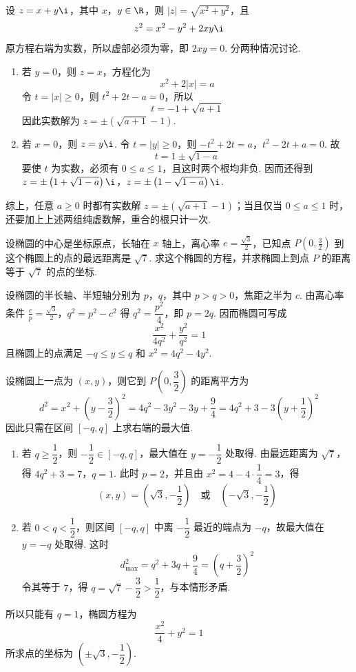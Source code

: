 \begin{solution}
设 \(z=x+y\i\)，其中 \(x\)，\(y\in\R\)，则 \(|z|=\sqrt{x^2+y^2}\)，且
\[
z^2=x^2-y^2+2xy\i
\]
原方程右端为实数，所以虚部必须为零，即 \(2xy=0\). 分两种情况讨论.
\begin{enumerate}
\item 若 \(y=0\)，则 \(z=x\)，方程化为
\[
x^2+2|x|=a
\]
令 \(t=|x|\geqslant0\)，则 \(t^2+2t-a=0\)，所以
\[
t=-1+\sqrt{a+1}
\]
因此实数解为 \(z=\pm\left(\sqrt{a+1}-1\right)\).

\item 若 \(x=0\)，则 \(z=y\i\). 令 \(t=|y|\geqslant0\)，则
\(-t^2+2t=a\)，\(t^2-2t+a=0\).
故
\[
t=1\pm\sqrt{1-a}
\]
要使 \(t\) 为实数，必须有 \(0\leqslant a\leqslant1\)，且这时两个根均非负. 因而还得到
\(z=\pm\left(1+\sqrt{1-a}\right)\i\)，\(z=\pm\left(1-\sqrt{1-a}\right)\i\).
\end{enumerate}
综上，任意 \(a\geqslant0\) 时都有实数解 \(z=\pm\left(\sqrt{a+1}-1\right)\)；当且仅当 \(0\leqslant a\leqslant1\) 时，还要加上上述两组纯虚数解，重合的根只计一次.
\end{solution}

\begin{problem}
设椭圆的中心是坐标原点，长轴在 \(x\) 轴上，离心率 \(e=\frac{\sqrt{3}}{2}\)，已知点 \(P\left( 0,\frac{3}{2} \right)\) 到这个椭圆上的点的最远距离是 \(\sqrt{7}\). 求这个椭圆的方程，并求椭圆上到点 \(P\) 的距离等于 \(\sqrt{7}\) 的点的坐标.
\end{problem}

\begin{solution}
设椭圆的半长轴、半短轴分别为 \(p\)，\(q\)，其中 \(p>q>0\)，焦距之半为 \(c\). 由离心率条件
\(\frac{c}{p}=\frac{\sqrt{3}}{2}\)，\(q^2=p^2-c^2\)
得 \(q^2=\dfrac{p^2}{4}\)，即 \(p=2q\). 因而椭圆可写成
\[
\frac{x^2}{4q^2}+\frac{y^2}{q^2}=1
\]
且椭圆上的点满足 \(-q\leqslant y\leqslant q\) 和 \(x^2=4q^2-4y^2\).

设椭圆上一点为 \((x,y)\)，则它到 \(P\left(0,\dfrac{3}{2}\right)\) 的距离平方为
\[
d^2=x^2+\left(y-\frac{3}{2}\right)^2
=4q^2-3y^2-3y+\frac{9}{4}
=4q^2+3-3\left(y+\frac{1}{2}\right)^2
\]
因此只需在区间 \([-q,q]\) 上求右端的最大值.
\begin{enumerate}
\item 若 \(q\geqslant\dfrac{1}{2}\)，则 \(-\dfrac{1}{2}\in[-q,q]\)，最大值在 \(y=-\dfrac{1}{2}\) 处取得. 由最远距离为 \(\sqrt{7}\)，得
\(4q^2+3=7\)，\(q=1\).
此时 \(p=2\)，并且由 \(x^2=4-4\cdot\dfrac{1}{4}=3\)，得
\[
(x,y)=\left(\sqrt{3},-\frac{1}{2}\right)\quad\text{或}\quad\left(-\sqrt{3},-\frac{1}{2}\right)
\]

\item 若 \(0<q<\dfrac{1}{2}\)，则区间 \([-q,q]\) 中离 \(-\dfrac{1}{2}\) 最近的端点为 \(-q\)，故最大值在 \(y=-q\) 处取得. 这时
\[
d_{\max}^2=q^2+3q+\frac{9}{4}=\left(q+\frac{3}{2}\right)^2
\]
令其等于 \(7\)，得 \(q=\sqrt{7}-\dfrac{3}{2}>\dfrac{1}{2}\)，与本情形矛盾.
\end{enumerate}
所以只能有 \(q=1\)，椭圆方程为
\[
\frac{x^2}{4}+y^2=1
\]
所求点的坐标为 \(\left(\pm\sqrt{3},-\dfrac{1}{2}\right)\).
\end{solution}
